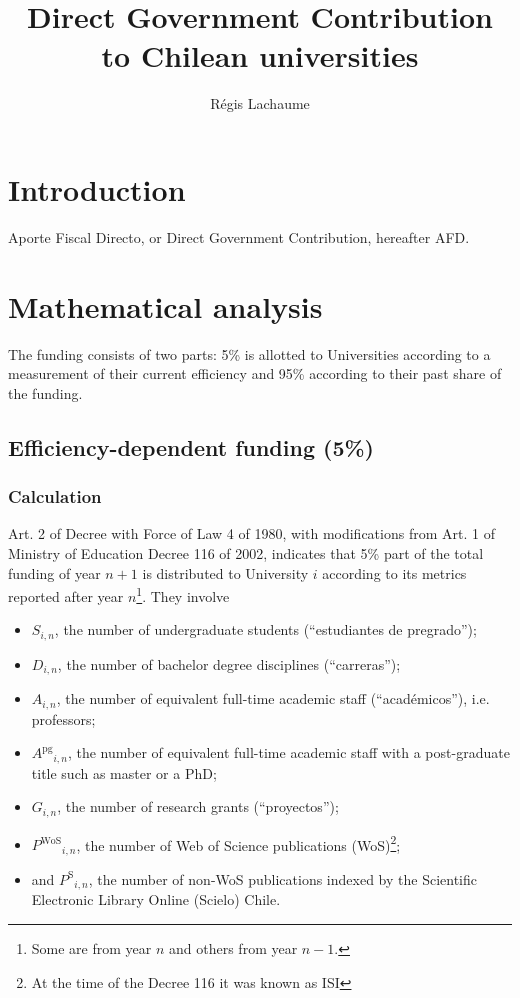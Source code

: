 \documentclass[twocolumn]{article}
\title{Direct Government Contribution to Chilean universities}
\author{Régis Lachaume}
\def\npup{\ensuremath{S}}
\def\nmaj{\ensuremath{D}}
\def\nprof{\ensuremath{A}}
\def\ngrad{\ensuremath{A^\text{pg}}}
\def\ngrant{\ensuremath{G}}
\def\nisi{\ensuremath{P^\text{WoS}}}
\def\nscielo{\ensuremath{P^\text{S}}}
\begin{document}
\maketitle

\section{Introduction}
Aporte Fiscal Directo, or Direct Government Contribution, hereafter AFD.

\section{Mathematical analysis}
The funding consists of two parts: 5\% is allotted to Universities according to a measurement of their current efficiency and 95\% according to their past share of the funding.

\subsection{Efficiency-dependent funding (5\%)}
\subsubsection{Calculation}
\label{sec:metrics}

Art. 2 of Decree with Force of Law 4 of 1980, with modifications from Art. 1 of Ministry of Education Decree 116 of 2002, indicates that 5\% part of the total funding of year $n + 1$ is distributed to University $i$ according to its metrics reported after year $n$\footnote{Some are from year $n$ and others from year $n-1$.}. They involve 
\begin{itemize}
\item $\npup_{i,n}$, the number of undergraduate students (``estudiantes de pregrado'');
\item $\nmaj_{i,n}$, the number of bachelor degree disciplines (``carreras'');
\item $\nprof_{i,n}$, the number of equivalent full-time academic staff (``académicos''), i.e. professors;
\item $\ngrad_{i,n}$, the number of equivalent full-time academic staff with a post-graduate title such as master or a PhD; 
\item $\ngrant_{i,n}$, the number of research grants (``proyectos'');
\item $\nisi_{i,n}$, the number of Web of Science publications (WoS)\footnote{At the time of the Decree 116 it was known as ISI}; 
\item and $\nscielo_{i,n}$, the number of non-WoS publications indexed by the Scientific Electronic Library Online (Scielo) Chile. 
\end{itemize}
\end{document}

